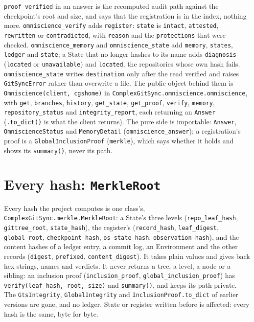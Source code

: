 \texttt{proof\_verified} in an answer is the recomputed audit path against the checkpoint's
root and size, and says that the registration is in the index, nothing more.
\texttt{omniscience\_verify} adds \texttt{register}: \texttt{state} is \texttt{intact},
\texttt{attested}, \texttt{rewritten} or \texttt{contradicted}, with \texttt{reason} and the
\texttt{protections} that were checked. \texttt{omniscience\_memory} and
\texttt{omniscience\_state} add \texttt{memory}, \texttt{states}, \texttt{ledger} and
\texttt{state}; a State that no longer hashes to its name adds \texttt{diagnosis}
(\texttt{located} or \texttt{unavailable}) and \texttt{located}, the repositories whose own hash
fails. \texttt{omniscience\_state} writes \texttt{destination} only after the read verified and
raises \texttt{GitSyncError} rather than overwrite a file. The public object behind them is
\texttt{Omniscience(client, cgshome)} in \texttt{ComplexGitSync.omniscience.omniscience}, with
\texttt{get}, \texttt{branches}, \texttt{history}, \texttt{get\_state}, \texttt{get\_proof},
\texttt{verify}, \texttt{memory}, \texttt{repository\_status} and \texttt{integrity\_report}, each
returning an \texttt{Answer} (\texttt{.to\_dict()} is what the client returns). The pure side
is importable: \texttt{Answer}, \texttt{OmniscienceStatus} and \texttt{MemoryDetail}
(\texttt{omniscience\_answer}); a registration's proof is a \texttt{GlobalInclusionProof}
(\texttt{merkle}), which says whether it holds and shows its \texttt{summary()}, never its path.

\section{Every hash: \texttt{MerkleRoot}}

Every hash the project computes is one class's, \texttt{ComplexGitSync.merkle.MerkleRoot}: a
State's three levels (\texttt{repo\_leaf\_hash}, \texttt{gittree\_root}, \texttt{state\_hash}),
the register's (\texttt{record\_hash}, \texttt{leaf\_digest}, \texttt{global\_root},
\texttt{checkpoint\_hash}, \texttt{os\_state\_hash}, \texttt{observation\_hash}), and the
content hashes of a ledger entry, a commit log, an Environment and the other records
(\texttt{digest}, \texttt{prefixed}, \texttt{content\_digest}). It takes plain values and gives
back hex strings, names and verdicts. It never returns a tree, a level, a node or a
sibling: an inclusion proof (\texttt{inclusion\_proof}, \texttt{global\_inclusion\_proof}) has
\texttt{verify(leaf\_hash, root, size)} and \texttt{summary()}, and keeps its path private. The
\texttt{GtsIntegrity}, \texttt{GlobalIntegrity} and \texttt{InclusionProof.to\_dict} of earlier
versions are gone, and no ledger, State or register written before is affected: every hash
is the same, byte for byte.

